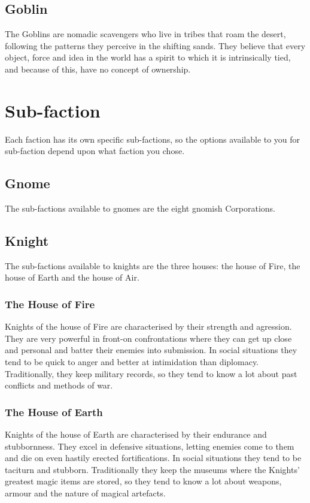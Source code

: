 \documentclass{report}
\begin{document}
\subsection{Goblin}
The Goblins are nomadic scavengers who live in tribes that roam the desert, following the patterns they perceive in the
shifting sands. They believe that every object, force and idea in the world has a spirit to which it is intrinsically tied,
and because of this, have no concept of ownership.

\section{Sub-faction}
Each faction has its own specific sub-factions, so the options available to you for sub-faction depend upon what faction
you chose.

\subsection{Gnome}
The sub-factions available to gnomes are the eight gnomish Corporations.

\subsection{Knight}
The sub-factions available to knights are the three houses: the house of Fire, the house of Earth and the house of Air.

\subsubsection{The House of Fire}
Knights of the house of Fire are characterised by their strength and agression. They are very powerful in front-on
confrontations where they can get up close and personal and batter their enemies into submission. In social situations they
tend to be quick to anger and better at intimidation than diplomacy. Traditionally, they keep military records, so they
tend to know a lot about past conflicts and methods of war.

\subsubsection{The House of Earth}
Knights of the house of Earth are characterised by their endurance and stubbornness. They excel in defensive situations,
letting enemies come to them and die on even hastily erected fortifications. In social situations they tend to be taciturn
and stubborn. Traditionally they keep the museums where the Knights' greatest magic items are stored, so they tend to know
a lot about weapons, armour and the nature of magical artefacts.
\end{document}
